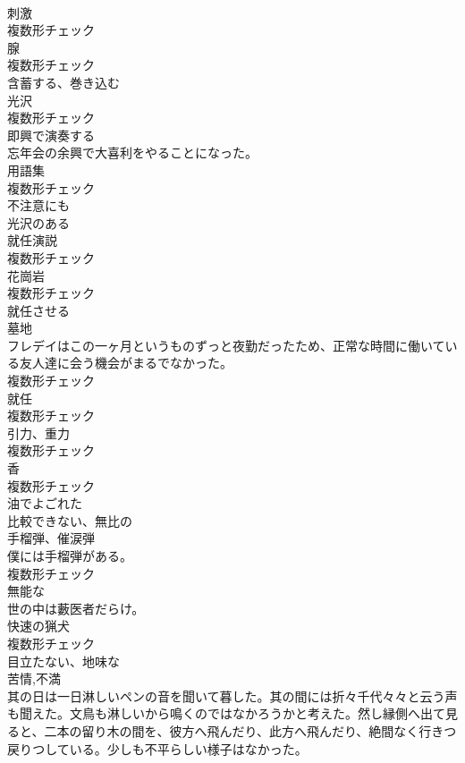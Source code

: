 \documentclass[8pt]{extreport}
\begin{document}
\begin{CJK}{UTF8}{min}
\\	[名詞]	刺激	
\\	複数形チェック
\\	[名詞]	腺	
\\	複数形チェック
\\	[動詞]	含蓄する、巻き込む	
\\	[名詞]	光沢	
\\	複数形チェック
\\	[動詞]	即興で演奏する	
\\	忘年会の余興で大喜利をやることになった。	
\\	[名詞]	用語集	
\\	複数形チェック
\\	[副詞]	不注意にも	
\\	[形容詞]	光沢のある	
\\	[名詞]	就任演説	
\\	複数形チェック
\\	[名詞]	花崗岩	
\\	複数形チェック
\\	[動詞]	就任させる	
\\	[名詞]	墓地	
\\	フレデイはこの一ヶ月というものずっと夜勤だったため、正常な時間に働いている友人達に会う機会がまるでなかった。	
\\	複数形チェック
\\	[名詞]	就任	
\\	複数形チェック
\\	[名詞]	引力、重力	
\\	複数形チェック
\\	[名詞]	香	
\\	複数形チェック
\\	[形容詞]	油でよごれた	
\\	[形容詞]	比較できない、無比の	
\\	[名詞]	手榴弾、催涙弾	
\\	僕には手榴弾がある。	
\\	複数形チェック
\\	[形容詞]	無能な	
\\	世の中は藪医者だらけ。	
\\	[名詞]	快速の猟犬	
\\	複数形チェック
\\	[形容詞]	目立たない、地味な	
\\	[名詞]	苦情,不満	
\\	其の日は一日淋しいペンの音を聞いて暮した。其の間には折々千代々々と云う声も聞えた。文鳥も淋しいから鳴くのではなかろうかと考えた。然し縁側へ出て見ると、二本の留り木の間を、彼方へ飛んだり、此方へ飛んだり、絶間なく行きつ戻りつしている。少しも不平らしい様子はなかった。	

\end{CJK}
\end{document}
